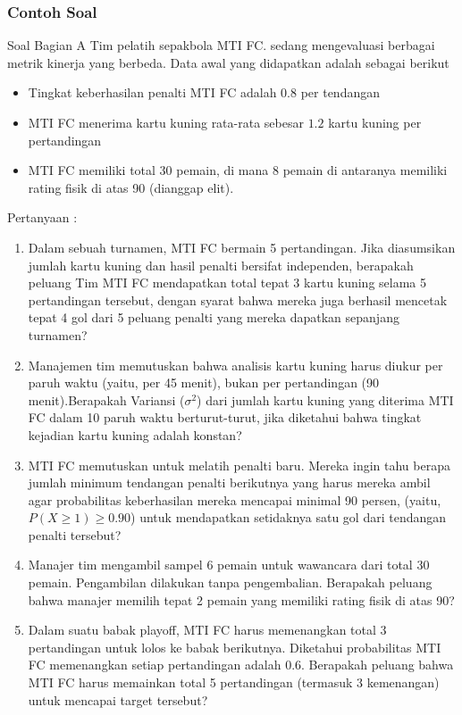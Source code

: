 \documentclass[]{beamer}
\begin{document}
\begin{frame}
\frametitle{Contoh Soal}
\tiny
    \begin{block}{Soal Bagian A}
        Tim pelatih sepakbola MTI FC. sedang mengevaluasi berbagai metrik kinerja yang berbeda. Data awal yang didapatkan adalah sebagai berikut
        \begin{itemize}
            \item Tingkat keberhasilan penalti MTI FC adalah $0.8$ per tendangan
            \item MTI FC menerima kartu kuning rata-rata sebesar $1.2$ kartu kuning per pertandingan
            \item MTI FC memiliki total 30 pemain, di mana 8 pemain di antaranya memiliki rating fisik di atas 90 (dianggap elit).
        \end{itemize}
        Pertanyaan :
        \begin{enumerate}
            \item Dalam sebuah turnamen, MTI FC bermain 5 pertandingan. Jika diasumsikan jumlah kartu kuning dan hasil penalti bersifat independen, berapakah peluang Tim MTI FC mendapatkan total tepat 3 kartu kuning selama 5 pertandingan tersebut, dengan syarat bahwa mereka juga berhasil mencetak tepat 4 gol dari 5 peluang penalti yang mereka dapatkan sepanjang turnamen?
            \item Manajemen tim memutuskan bahwa analisis kartu kuning harus diukur per paruh waktu (yaitu, per 45 menit), bukan per pertandingan (90 menit).Berapakah Variansi ($\sigma^2$) dari jumlah kartu kuning yang diterima MTI FC dalam 10 paruh waktu berturut-turut, jika diketahui bahwa tingkat kejadian kartu kuning adalah konstan?
            \item MTI FC memutuskan untuk melatih penalti baru. Mereka ingin tahu berapa jumlah minimum tendangan penalti berikutnya yang harus mereka ambil agar probabilitas keberhasilan mereka mencapai minimal 90 persen, (yaitu, $P(X \ge 1) \ge 0.90$) untuk mendapatkan setidaknya satu gol dari tendangan penalti tersebut?
            \item Manajer tim mengambil sampel 6 pemain untuk wawancara dari total 30 pemain. Pengambilan dilakukan tanpa pengembalian. Berapakah peluang bahwa manajer memilih tepat 2 pemain yang memiliki rating fisik di atas 90?
            \item Dalam suatu babak playoff, MTI FC harus memenangkan total 3 pertandingan untuk lolos ke babak berikutnya. Diketahui probabilitas MTI FC memenangkan setiap pertandingan adalah 0.6. Berapakah peluang bahwa MTI FC harus memainkan total 5 pertandingan (termasuk 3 kemenangan) untuk mencapai target tersebut?
        \end{enumerate}
    \end{block}
\end{frame}
\end{document}
